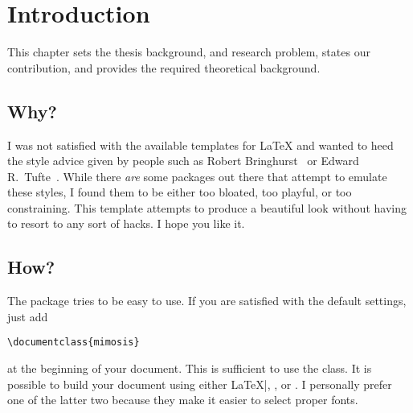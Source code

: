 \chapter{Introduction}

\begin{center}
  \begin{minipage}{0.5\textwidth}
    \begin{small}
      This chapter sets the thesis background, and research problem, states our contribution, and provides the required theoretical background.
    \end{small}
  \end{minipage}
  \vspace{0.5cm}
\end{center}

\minitoc

\section{Why?}

I was not satisfied with the available templates for \LaTeX{} and wanted
to heed the style advice given by people such as Robert
Bringhurst~\cite{Bringhurst12} or Edward R.\
Tufte~\cite{Tufte90,Tufte01}. While there \emph{are} some packages out
there that attempt to emulate these styles, I found them to be either
too bloated, too playful, or too constraining. This template attempts to
produce a beautiful look without having to resort to any sort of hacks.
I hope you like it.

\section{How?}

The package tries to be easy to use. If you are satisfied with the
default settings, just add
%
\begin{verbatim}
\documentclass{mimosis}
\end{verbatim}
%
at the beginning of your document. This is sufficient to use the class.
It is possible to build your document using either \LaTeX|, \XeLaTeX, or
\LuaLaTeX. I personally prefer one of the latter two because they make
it easier to select proper fonts.

